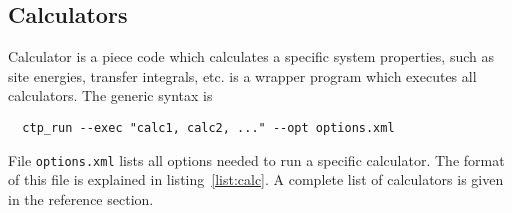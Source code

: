 \subsection{Calculators}
\label{sec:calculators}

Calculator is a piece code which calculates a specific system properties, such as site energies, transfer integrals, etc. \ctprun is a wrapper program which executes all calculators. The generic syntax is 
\begin{verbatim}
  ctp_run --exec "calc1, calc2, ..." --opt options.xml
\end{verbatim}
%
File \texttt{options.xml} lists all options needed to run a specific calculator. The format of this file is explained in listing~\ref{list:calc}. A complete list of calculators is given in the  reference section.
%

